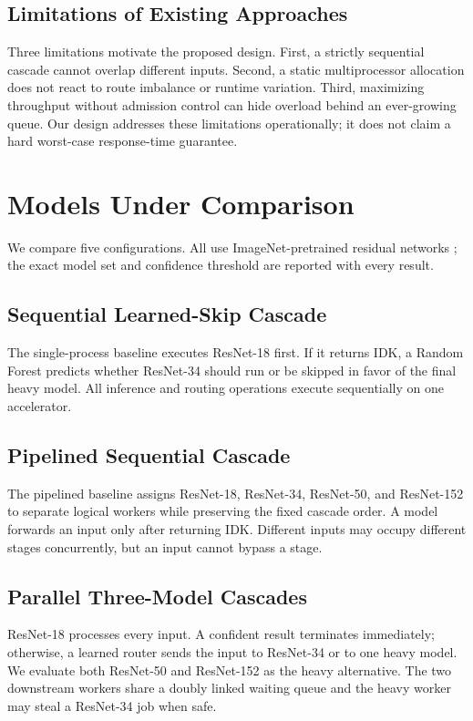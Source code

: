 \subsection{Limitations of Existing Approaches}

Three limitations motivate the proposed design.  First, a strictly sequential
cascade cannot overlap different inputs.  Second, a static multiprocessor
allocation does not react to route imbalance or runtime variation.  Third,
maximizing throughput without admission control can hide overload behind an
ever-growing queue.  Our design addresses these limitations operationally; it
does not claim a hard worst-case response-time guarantee.

\section{Models Under Comparison}
\label{sec:comparisons}

We compare five configurations.  All use ImageNet-pretrained residual networks
\cite{he2016resnet}; the exact model set and confidence threshold are reported
with every result.

\subsection{Sequential Learned-Skip Cascade}

The single-process baseline executes ResNet-18 first.  If it returns IDK, a
Random Forest predicts whether ResNet-34 should run or be skipped in favor of
the final heavy model.  All inference and routing operations execute
sequentially on one accelerator.

\subsection{Pipelined Sequential Cascade}

The pipelined baseline assigns ResNet-18, ResNet-34, ResNet-50, and ResNet-152
to separate logical workers while preserving the fixed cascade order.  A model
forwards an input only after returning IDK.  Different inputs may occupy
different stages concurrently, but an input cannot bypass a stage.

\subsection{Parallel Three-Model Cascades}

ResNet-18 processes every input.  A confident result terminates immediately;
otherwise, a learned router sends the input to ResNet-34 or to one heavy model.
We evaluate both ResNet-50 and ResNet-152 as the heavy alternative.  The two
downstream workers share a doubly linked waiting queue and the heavy worker may
steal a ResNet-34 job when safe.

